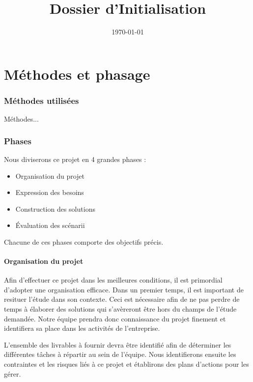 \documentclass[a4paper,11pt]{report}
\title{Dossier d'Initialisation}
\date\today
\begin{document}
\maketitle
\newpage


\chapter*{M\'ethodes et phasage}

\subsection*{M\'ethodes utilis\'ees}

M\'ethodes...

\subsection*{Phases}

Nous diviserons ce projet en 4 grandes phases :


\begin{itemize}
 \item Organisation du projet
 \item Expression des besoins
 \item Construction des solutions
 \item \'Evaluation des sc\'enarii
\end{itemize}


Chacune de ces phases comporte des objectifs pr\'ecis.

\subsubsection*{Organisation du projet}

Afin d'effectuer ce projet dans les meilleures conditions, il est primordial d'adopter une organisation efficace.
Dans un premier temps, il est important de resituer l'\'etude dans son contexte. 
Ceci est n\'ecessaire afin de ne pas perdre de temps \`a \'elaborer des solutions qui s'avèreront \^etre hors du champs de l'\'etude demand\'ee.
Notre \'equipe prendra donc connaissance du projet finement et identifiera sa place dans les activit\'es de l'entreprise.

L'ensemble des livrables \`a fournir devra \^etre identifi\'e afin de d\'eterminer les diff\'erentes t\^aches \`a r\'epartir au sein de l'\'equipe.
Nous identifierons ensuite les contraintes et les risques li\'es \`a ce projet et \'etablirons des plans d'actions pour les g\'erer.
\end{document}
